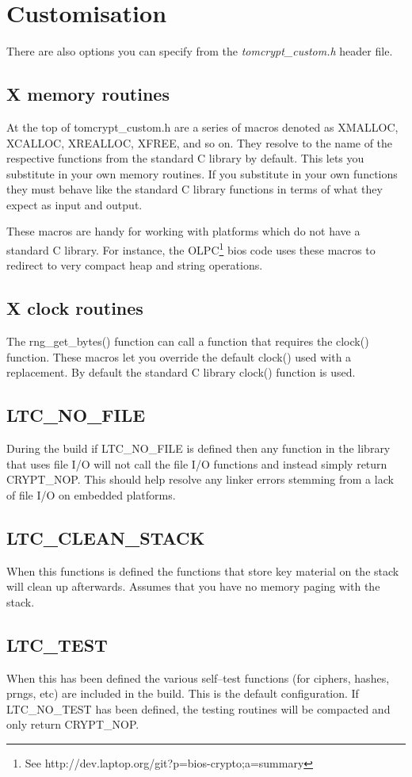 \documentclass[synpaper]{book}
\newcommand{\mysection}[1]    %
	{                   %
	\section{#1}
   \markboth{\textsf{www.libtom.org}}{\thesection ~ {#1}}
	}
\begin{document}
\mysection{Customisation}
There are also options you can specify from the \textit{tomcrypt\_custom.h} header file.

\subsection{X memory routines}
At the top of tomcrypt\_custom.h are a series of macros denoted as XMALLOC, XCALLOC, XREALLOC, XFREE, and so on.  They resolve to 
the name of the respective functions from the standard C library by default.  This lets you substitute in your own memory routines.  
If you substitute in your own functions they must behave like the standard C library functions in terms of what they expect as input and 
output.

These macros are handy for working with platforms which do not have a standard C library.  For instance, the OLPC\footnote{See http://dev.laptop.org/git?p=bios-crypto;a=summary}
bios code uses these macros to redirect to very compact heap and string operations.

\subsection{X clock routines}
The rng\_get\_bytes() function can call a function that requires the clock() function.  These macros let you override
the default clock() used with a replacement.  By default the standard C library clock() function is used.

\subsection{LTC\_NO\_FILE}
During the build if LTC\_NO\_FILE is defined then any function in the library that uses file I/O will not call the file I/O 
functions and instead simply return CRYPT\_NOP.  This should help resolve any linker errors stemming from a lack of
file I/O on embedded platforms.

\subsection{LTC\_CLEAN\_STACK}
When this functions is defined the functions that store key material on the stack will clean up afterwards.  
Assumes that you have no memory paging with the stack.

\subsection{LTC\_TEST}
When this has been defined the various self--test functions (for ciphers, hashes, prngs, etc) are included in the build.  This is the default configuration.
If LTC\_NO\_TEST has been defined, the testing routines will be compacted and only return CRYPT\_NOP.
\end{document}
